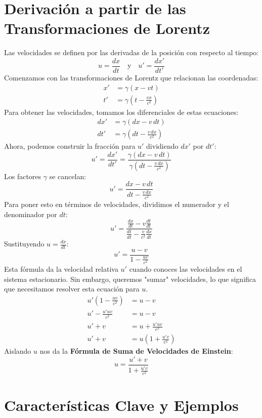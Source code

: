 \documentclass[11pt,a4paper]{article}
\begin{document}
\section{Derivación a partir de las Transformaciones de Lorentz}

Las velocidades se definen por las derivadas de la posición con respecto al tiempo:
\[ u = \frac{dx}{dt} \quad \text{y} \quad u' = \frac{dx'}{dt'} \]
Comenzamos con las transformaciones de Lorentz que relacionan las coordenadas:
\begin{align*}
x' &= \gamma(x - vt) \\
t' &= \gamma\left(t - \frac{vx}{c^2}\right)
\end{align*}
Para obtener las velocidades, tomamos los diferenciales de estas ecuaciones:
\begin{align*}
dx' &= \gamma(dx - v\,dt) \\
dt' &= \gamma\left(dt - \frac{v\,dx}{c^2}\right)
\end{align*}
Ahora, podemos construir la fracción para $u'$ dividiendo $dx'$ por $dt'$:
\[ u' = \frac{dx'}{dt'} = \frac{\gamma(dx - v\,dt)}{\gamma\left(dt - \frac{v\,dx}{c^2}\right)} \]
Los factores $\gamma$ se cancelan:
\[ u' = \frac{dx - v\,dt}{dt - \frac{v\,dx}{c^2}} \]
Para poner esto en términos de velocidades, dividimos el numerador y el denominador por $dt$:
\[ u' = \frac{\frac{dx}{dt} - v\frac{dt}{dt}}{\frac{dt}{dt} - \frac{v}{c^2}\frac{dx}{dt}} \]
Sustituyendo $u = \frac{dx}{dt}$:
\[ u' = \frac{u - v}{1 - \frac{uv}{c^2}} \]
Esta fórmula da la velocidad relativa $u'$ cuando conoces las velocidades en el sistema estacionario. Sin embargo, queremos "sumar" velocidades, lo que significa que necesitamos resolver esta ecuación para $u$.
\begin{align*}
u'\left(1 - \frac{uv}{c^2}\right) &= u - v \\
u' - \frac{u'uv}{c^2} &= u - v \\
u' + v &= u + \frac{u'uv}{c^2} \\
u' + v &= u\left(1 + \frac{u'v}{c^2}\right)
\end{align*}
Aislando $u$ nos da la \textbf{Fórmula de Suma de Velocidades de Einstein}:
\[
\boxed{
u = \frac{u' + v}{1 + \frac{u'v}{c^2}}
}
\]

\section{Características Clave y Ejemplos}
\end{document}
